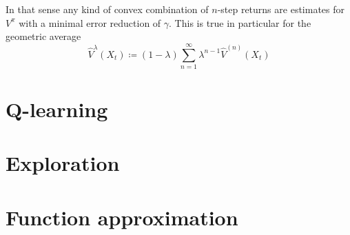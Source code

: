 In that sense any kind of convex combination of \(n\)-step returns are estimates for \(V^\pi\) with a minimal error reduction of \(\gamma\). This is true in particular for the geometric average
\[
	\hat{V}^\lambda(X_t)\coloneqq (1-\lambda)\sum_{n=1}^\infty \lambda^{n-1} \hat{V}^{(n)}(X_t)
\]




\section{Q-learning}


\section{Exploration}

\section{Function approximation}

\endinput

